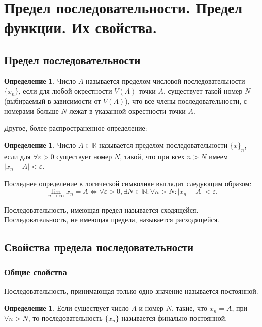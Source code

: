 \documentclass[12pt]{report}
\theoremstyle{definition}
\newtheorem{definition}[theorem]{Определение}
\newcommand{\R}{\mathbb R}
\newcommand{\N}{\mathbb N}
\begin{document}

\section{Предел последовательности. Предел функции. Их свойства.}
\subsection{Предел последовательности}
\begin{definition}
Число $A$ называется пределом числовой последовательности $\{x_n\}$,
если для любой окрестности $V(A)$ точки $A$, существует такой номер $N$
(выбираемый в зависимости от $V(A)$), что все члены последовательности,
с номерами больше $N$ лежат в указанной окрестности точки $A$.
\end{definition}

Другое, более распространенное определение:

\begin{definition}
Число $A \in \R$ называется пределом последовательности $\{x\}_n$, если
для $\forall \varepsilon > 0$ существует номер $N$, такой, что при всех
$n > N$ имеем $|x_n - A| < \varepsilon$.
\end{definition}

Последнее определение в логической символике выглядит следующим образом:
$$
  \lim\limits_{n \rightarrow \infty} x_n = A
    \Leftrightarrow
  \forall \varepsilon > 0, \exists N \in \N: \forall n > N: |x_n - A| < \varepsilon.
$$

Последовательность, имеющая предел называется сходящейся.
Последовательность, не имеющая предела, называется расходящейся.

\subsection{Свойства предела последовательности}

\subsubsection{Общие свойства}
Последовательность, принимающая только одно значение называется постоянной.

\begin{definition}
Если существует число $A$ и номер $N$, такие, что
$x_n = A$, при $\forall n > N$, то последовательность
$\{x_n\}$ называется финально постоянной.
\end{definition}
\end{document}
